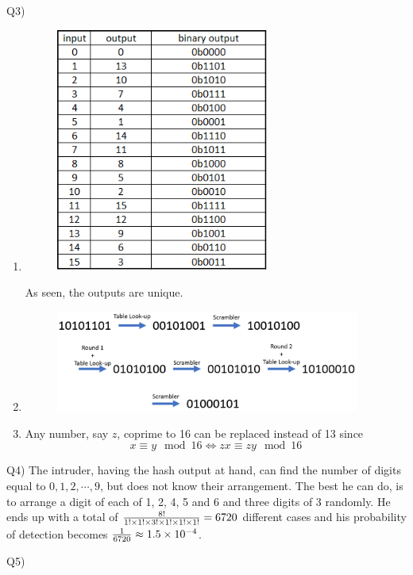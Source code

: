 \documentclass[10pt,letterpaper]{article}
\begin{document}
Q3) 

\begin{enumerate}[label=\alph*-]

\item
\begin{figure}[htbp]
\centering
\includegraphics[width=70mm]{Table_10.png}
\end{figure}
As seen, the outputs are unique.
\item
\begin{figure}[htbp]
\centering
\includegraphics[width=100mm]{Trans.png}
\end{figure}
\item
Any number, say $z$, coprime to 16 can be replaced instead of 13 since
$$
x\equiv y\mod 16\iff zx\equiv zy\mod 16
$$
\end{enumerate}



Q4) The intruder, having the hash output at hand, can find the number of digits equal to $0,1,2,\cdots ,9$, but does not know their arrangement. The best he can do, is to arrange a digit of each of 1, 2, 4, 5 and 6 and three digits of 3 randomly. He ends up with a total of 
$
{8!\over 1!\times1!\times3!\times1!\times1!\times1!}=6720
$
 different cases and his probability of detection becomes ${1\over 6720}\approx 1.5\times 10^{-4}$.


Q5) 
\end{document}
